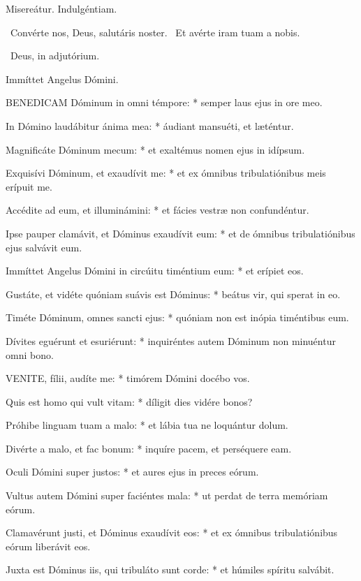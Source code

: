  Misereátur. Indulgéntiam.

\V\ Convérte nos, Deus, salutáris noster. \R\ Et avérte iram tuam a nobis.

\V\ Deus, in adjutórium.

 Immíttet Angelus Dómini.


\lettrine[lines=2]{B}{ENEDICAM} Dóminum in omni témpore: * semper laus ejus in ore meo.

In Dómino laudábitur ánima mea: * áudiant mansuéti, et læténtur.

Magnificáte Dóminum mecum: * et exaltémus nomen ejus in idípsum.

Exquisívi Dóminum, et exaudívit me: * et ex ómnibus tribulatiónibus meis erípuit me.

Accédite ad eum, et illuminámini: * et fácies vestræ non confundéntur.

Ipse pauper clamávit, et Dóminus exaudívit eum: * et de ómnibus tribulatiónibus ejus salvávit eum.

Immíttet Angelus Dómini in circúitu timéntium eum: * et erípiet eos.

Gustáte, et vidéte quóniam suávis est Dóminus: * beátus vir, qui sperat in eo.

Timéte Dóminum, omnes sancti ejus: * quóniam non est inópia timéntibus eum.

Dívites eguérunt et esuriérunt: * inquiréntes autem Dóminum non minuéntur omni bono.


\lettrine[lines=2]{V}{ENITE}, fílii, audíte me: * timórem Dómini docébo vos.

Quis est homo qui vult vitam: * díligit dies vidére bonos?

Próhibe linguam tuam a malo: * et lábia tua ne loquántur dolum.

Divérte a malo, et fac bonum: * inquíre pacem, et perséquere eam.

Oculi Dómini super justos: * et aures ejus in preces eórum.

Vultus autem Dómini super faciéntes mala: * ut perdat de terra memóriam eórum.

Clamavérunt justi, et Dóminus exaudívit eos: * et ex ómnibus tribulatiónibus eórum liberávit eos.

Juxta est Dóminus iis, qui tribuláto sunt corde: * et húmiles spíritu salvábit.

